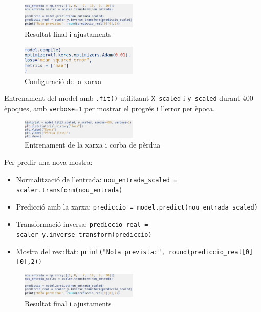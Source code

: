\begin{figure}[H]
\centering
\includegraphics[width=0.5\textwidth]{./figures/29.png}
\caption{Resultat final i ajustaments}
\end{figure}

\begin{figure}[H]
\centering
\includegraphics[width=0.5\textwidth]{./figures/27.png}
\caption{Configuració de la xarxa}
\end{figure}

Entrenament del model amb \texttt{.fit()} utilitzant \texttt{X\_scaled} i \texttt{y\_scaled} durant 400 èpoques, amb \texttt{verbose=1} per mostrar el progrés i l’error per època.

\begin{figure}[H]
\centering
\includegraphics[width=0.5\textwidth]{./figures/28.png}
\caption{Entrenament de la xarxa i corba de pèrdua}
\end{figure}

Per predir una nova mostra:

\begin{itemize}
\item Normalització de l’entrada: \texttt{nou\_entrada\_scaled = scaler.transform(nou\_entrada)}
\item Predicció amb la xarxa: \texttt{prediccio = model.predict(nou\_entrada\_scaled)}
\item Transformació inversa: \texttt{prediccio\_real = scaler\_y.inverse\_transform(prediccio)}
\item Mostra del resultat: \texttt{print("Nota prevista:", round(prediccio\_real[0][0],2))}
\end{itemize}

\begin{figure}[H]
\centering
\includegraphics[width=0.5\textwidth]{./figures/29.png}
\caption{Resultat final i ajustaments}
\end{figure}

